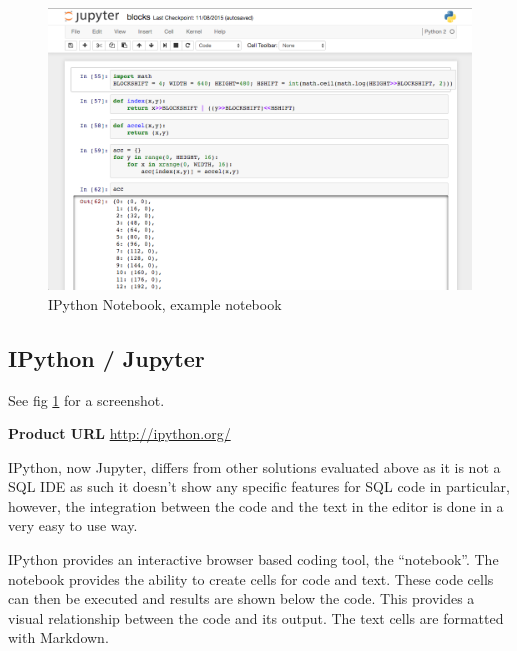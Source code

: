 \begin{figure}
  \includegraphics[width=\linewidth]{Figures/ipython.png}
  \caption{IPython Notebook, example notebook}
  \label{fig:ipythonnotebook}
\end{figure}

\subsection{IPython / Jupyter}\label{ipython-jupyter}

\noindent
See fig \ref{fig:ipythonnotebook} for a screenshot.

\noindent
\textbf{Product URL}\cite{PER-GRA:2007}
\url{http://ipython.org/}

IPython, now Jupyter, differs from other solutions evaluated above as it is not
a SQL IDE as such it doesn't show any specific features for SQL code in
particular, however, the integration between the code and the text in the editor
is done in a very easy to use way.

IPython provides an interactive browser based coding tool, the ``notebook''. The
notebook provides the ability to create cells for code and text. These code cells
can then be executed and results are shown below the code. This provides a
visual relationship between the code and its output. The text cells are
formatted with Markdown\cite{wiki:markdown}.

